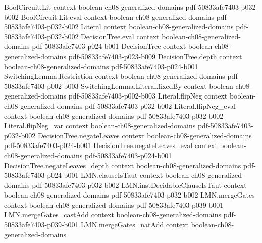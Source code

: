\begin{lemma}
\label{BoolFourier.inner_product_char_nonself}
\leanok
{}
\proofstep
  {BoolCircuit.Lit}
  {context}
  {boolean-ch08-generalized-domains}
  {pdf-50833afe7403-p032-b002}
\proofstep
  {BoolCircuit.Lit.eval}
  {context}
  {boolean-ch08-generalized-domains}
  {pdf-50833afe7403-p032-b002}
\proofstep
  {Literal}
  {context}
  {boolean-ch08-generalized-domains}
  {pdf-50833afe7403-p032-b002}
\proofstep
  {DecisionTree.eval}
  {context}
  {boolean-ch08-generalized-domains}
  {pdf-50833afe7403-p024-b001}
\proofstep
  {DecisionTree}
  {context}
  {boolean-ch08-generalized-domains}
  {pdf-50833afe7403-p023-b009}
\proofstep
  {DecisionTree.depth}
  {context}
  {boolean-ch08-generalized-domains}
  {pdf-50833afe7403-p024-b001}
\proofstep
  {SwitchingLemma.Restriction}
  {context}
  {boolean-ch08-generalized-domains}
  {pdf-50833afe7403-p002-b003}
\proofstep
  {SwitchingLemma.Literal.fixedBy}
  {context}
  {boolean-ch08-generalized-domains}
  {pdf-50833afe7403-p002-b003}
\proofstep
  {Literal.flipNeg}
  {context}
  {boolean-ch08-generalized-domains}
  {pdf-50833afe7403-p032-b002}
\proofstep
  {Literal.flipNeg_eval}
  {context}
  {boolean-ch08-generalized-domains}
  {pdf-50833afe7403-p032-b002}
\proofstep
  {Literal.flipNeg_var}
  {context}
  {boolean-ch08-generalized-domains}
  {pdf-50833afe7403-p032-b002}
\proofstep
  {DecisionTree.negateLeaves}
  {context}
  {boolean-ch08-generalized-domains}
  {pdf-50833afe7403-p024-b001}
\proofstep
  {DecisionTree.negateLeaves_eval}
  {context}
  {boolean-ch08-generalized-domains}
  {pdf-50833afe7403-p024-b001}
\proofstep
  {DecisionTree.negateLeaves_depth}
  {context}
  {boolean-ch08-generalized-domains}
  {pdf-50833afe7403-p024-b001}
\proofstep
  {LMN.clauseIsTaut}
  {context}
  {boolean-ch08-generalized-domains}
  {pdf-50833afe7403-p032-b002}
\proofstep
  {LMN.instDecidableClauseIsTaut}
  {context}
  {boolean-ch08-generalized-domains}
  {pdf-50833afe7403-p032-b002}
\proofstep
  {LMN.mergeGates}
  {context}
  {boolean-ch08-generalized-domains}
  {pdf-50833afe7403-p039-b001}
\proofstep
  {LMN.mergeGates_castAdd}
  {context}
  {boolean-ch08-generalized-domains}
  {pdf-50833afe7403-p039-b001}
\proofstep
  {LMN.mergeGates_natAdd}
  {context}
  {boolean-ch08-generalized-domains}

\end{lemma}
